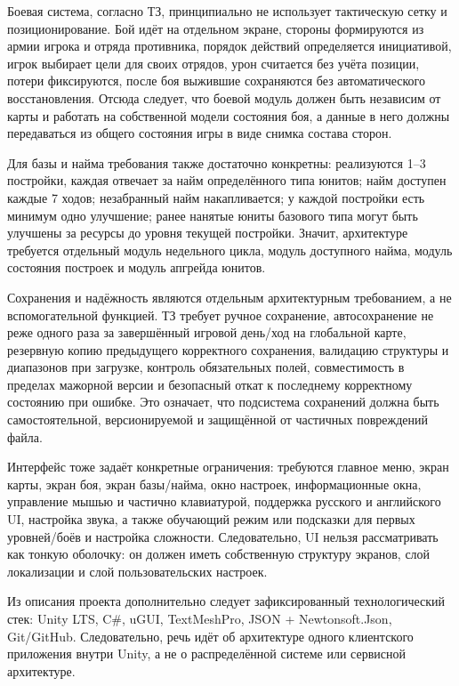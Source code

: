 \documentclass[12pt,a4paper]{article}
\begin{document}
Боевая система, согласно ТЗ, принципиально не использует тактическую сетку и позиционирование. Бой идёт на отдельном экране, стороны формируются из армии игрока и отряда противника, порядок действий определяется инициативой, игрок выбирает цели для своих отрядов, урон считается без учёта позиции, потери фиксируются, после боя выжившие сохраняются без автоматического восстановления. Отсюда следует, что боевой модуль должен быть независим от карты и работать на собственной модели состояния боя, а данные в него должны передаваться из общего состояния игры в виде снимка состава сторон.

Для базы и найма требования также достаточно конкретны: реализуются 1--3 постройки, каждая отвечает за найм определённого типа юнитов; найм доступен каждые 7 ходов; незабранный найм накапливается; у каждой постройки есть минимум одно улучшение; ранее нанятые юниты базового типа могут быть улучшены за ресурсы до уровня текущей постройки. Значит, архитектуре требуется отдельный модуль недельного цикла, модуль доступного найма, модуль состояния построек и модуль апгрейда юнитов.

Сохранения и надёжность являются отдельным архитектурным требованием, а не вспомогательной функцией. ТЗ требует ручное сохранение, автосохранение не реже одного раза за завершённый игровой день/ход на глобальной карте, резервную копию предыдущего корректного сохранения, валидацию структуры и диапазонов при загрузке, контроль обязательных полей, совместимость в пределах мажорной версии и безопасный откат к последнему корректному состоянию при ошибке. Это означает, что подсистема сохранений должна быть самостоятельной, версионируемой и защищённой от частичных повреждений файла.

Интерфейс тоже задаёт конкретные ограничения: требуются главное меню, экран карты, экран боя, экран базы/найма, окно настроек, информационные окна, управление мышью и частично клавиатурой, поддержка русского и английского UI, настройка звука, а также обучающий режим или подсказки для первых уровней/боёв и настройка сложности. Следовательно, UI нельзя рассматривать как тонкую оболочку: он должен иметь собственную структуру экранов, слой локализации и слой пользовательских настроек.

Из описания проекта дополнительно следует зафиксированный технологический стек: Unity LTS, C\#, uGUI, TextMeshPro, JSON + Newtonsoft.Json, Git/GitHub. Следовательно, речь идёт об архитектуре одного клиентского приложения внутри Unity, а не о распределённой системе или сервисной архитектуре.
\end{document}
